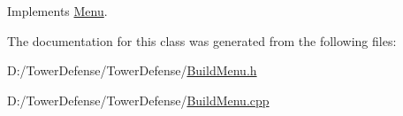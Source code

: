 Implements \hyperlink{class_menu_a91ec4d6d898e740524b1fe3312d8f197}{Menu}.



The documentation for this class was generated from the following files\+:\begin{DoxyCompactItemize}
\item 
D\+:/\+Tower\+Defense/\+Tower\+Defense/\hyperlink{_build_menu_8h}{Build\+Menu.\+h}\item 
D\+:/\+Tower\+Defense/\+Tower\+Defense/\hyperlink{_build_menu_8cpp}{Build\+Menu.\+cpp}\end{DoxyCompactItemize}
